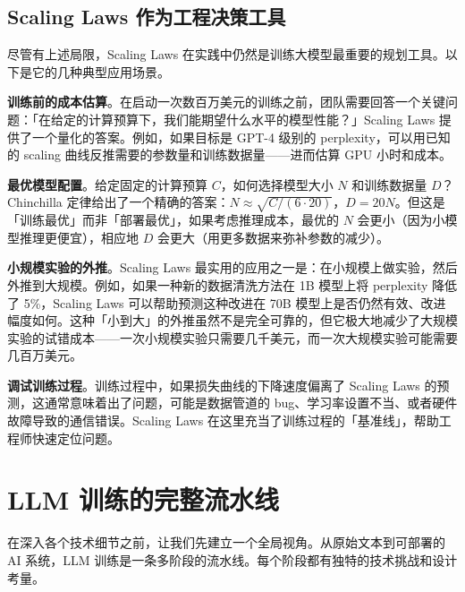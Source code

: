 \subsection{Scaling Laws 作为工程决策工具}

尽管有上述局限，Scaling Laws 在实践中仍然是训练大模型最重要的规划工具。以下是它的几种典型应用场景。

\textbf{训练前的成本估算}。在启动一次数百万美元的训练之前，团队需要回答一个关键问题：「在给定的计算预算下，我们能期望什么水平的模型性能？」Scaling Laws 提供了一个量化的答案。例如，如果目标是 GPT-4 级别的 perplexity，可以用已知的 scaling 曲线反推需要的参数量和训练数据量——进而估算 GPU 小时和成本。

\textbf{最优模型配置}。给定固定的计算预算 $C$，如何选择模型大小 $N$ 和训练数据量 $D$？Chinchilla 定律给出了一个精确的答案：$N \approx \sqrt{C/(6 \cdot 20)}$，$D = 20N$。但这是「训练最优」而非「部署最优」，如果考虑推理成本，最优的 $N$ 会更小（因为小模型推理更便宜），相应地 $D$ 会更大（用更多数据来弥补参数的减少）。

\textbf{小规模实验的外推}。Scaling Laws 最实用的应用之一是：在小规模上做实验，然后外推到大规模。例如，如果一种新的数据清洗方法在 1B 模型上将 perplexity 降低了 5\%，Scaling Laws 可以帮助预测这种改进在 70B 模型上是否仍然有效、改进幅度如何。这种「小到大」的外推虽然不是完全可靠的，但它极大地减少了大规模实验的试错成本——一次小规模实验只需要几千美元，而一次大规模实验可能需要几百万美元。

\textbf{调试训练过程}。训练过程中，如果损失曲线的下降速度偏离了 Scaling Laws 的预测，这通常意味着出了问题，可能是数据管道的 bug、学习率设置不当、或者硬件故障导致的通信错误。Scaling Laws 在这里充当了训练过程的「基准线」，帮助工程师快速定位问题。

\section{LLM 训练的完整流水线}

在深入各个技术细节之前，让我们先建立一个全局视角。从原始文本到可部署的 AI 系统，LLM 训练是一条多阶段的流水线。每个阶段都有独特的技术挑战和设计考量。

